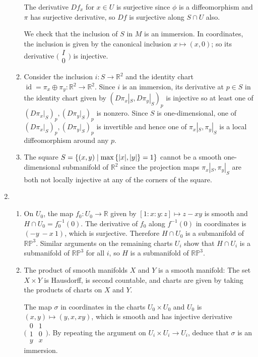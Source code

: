 \documentclass[11pt,leqno]{article}
\theoremstyle{plain}
\theoremstyle{definition}
\numberwithin{equation}{section}
\numberwithin{lem}{section}
\newcommand{\cbr}[1]{\left\{#1\right\}}
\DeclareMathOperator{\id}{id}
\begin{document}
\begin{enumerate}
\begin{enumerate}
      The derivative $Df_x$ for $x\in U$ is surjective since $\phi$ is a diffeomorphism and $\pi$ has surjective derivative, so $Df$ is surjective along $S\cap U$ also.

      We check that the inclusion of $S$ in $M$ is an immersion. In coordinates, the inclusion is given by the canonical inclusion $x\mapsto (x,0)$; so its derivative $\big(\!\begin{smallmatrix}
        I \\ 0
      \end{smallmatrix}\!\big)$ is injective.
      \item Consider the inclusion $i\colon S\to \mathbb R^2$ and the identity chart $\id = \pi_x\oplus \pi_y\colon \mathbb R^2\to\mathbb R^2$. Since $i$ is an immersion, its derivative at $p\in S$ in the identity chart given by $(D\pi_x|_S,D\pi_y|_S)_p$ is injective so at least one of $(D\pi_x|_S)_p,(D\pi_y|_S)_p$ is nonzero. Since $S$ is one-dimensional, one of $(D\pi_x|_S)_p,(D\pi_y|_S)_p$ is invertible and hence one of $\pi_x|_S, \pi_y|_S$ is a local diffeomorphism around any $p$.
      \item The square $S = \cbr{(x,y)\mid \max\cbr{\abs{x},\abs{y}} = 1}$ cannot be a smooth one-dimensional submanifold of $\mathbb R^2$ since the projection maps $\pi_x|_S, \pi_y|_S$ are both not locally injective at any of the corners of the square.
    \end{enumerate}
    \item \begin{enumerate}
      \item On $U_0$, the map $f_0\colon U_0\to \mathbb R$ given by $[1:x:y:z]\mapsto z-xy$ is smooth and $H\cap U_0 = f_0^{-1}(0)$. The derivative of $f_0$ along $f^{-1}(0)$ in coordinates is $(-y~-x~1)$, which is surjective. Therefore $H\cap U_0$ is a submanifold of $\mathbb{RP}^3$. Similar arguments on the remaining charts $U_i$ show that $H\cap U_i$ is a submanifold of $\mathbb{RP}^3$ for all $i$, so $H$ is a submanifold of $\mathbb{RP}^3$.
      \item The product of smooth manifolds $X$ and $Y$ is a smooth manifold: The set $X\times Y$ is Hausdorff, is second countable, and charts are given by taking the products of charts on $X$ and $Y$.
      
      The map $\sigma$ in coordinates in the charts $U_0\times U_0$ and $U_0$ is $(x,y)\mapsto (y,x,xy)$, which is smooth and has injective derivative $\Big(\!\begin{smallmatrix}
        0 & 1 \\
        1 & 0 \\
        y & x
      \end{smallmatrix}\!\Big)$. By repeating the argument on $U_i\times U_i\to U_i$, deduce that $\sigma$ is an immersion.
      

\end{enumerate}
\end{enumerate}
\end{document}
